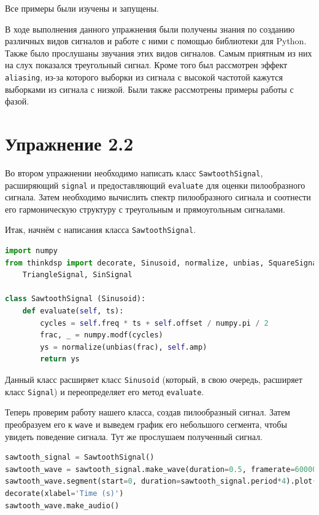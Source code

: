 \documentclass[a4paper, 14pt]{extarticle}
\begin{document}
    Все примеры были изучены и запущены.

    В ходе выполнения данного упражнения были получены знания по созданию различных видов сигналов и работе с ними с помощью библиотеки для Python.
    Также было прослушаны звучания этих видов сигналов. Самым приятным из них на слух показался треугольный сигнал.
    Кроме того был рассмотрен эффект \texttt{aliasing}, из-за которого выборки из сигнала с высокой частотой кажутся выборками из сигнала с низкой.
    Были также рассмотрены примеры работы с фазой.

    \newpage

    \section{Упражнение 2.2}
    \label{sec:task2}

    Во втором упражнении необходимо написать класс \texttt{SawtoothSignal}, расширяющий \texttt{signal} и предоставляющий \texttt{evaluate} для оценки пилообразного сигнала.
    Затем необходимо вычислить спектр пилообразного сигнала и соотнести его гармоническую структуру с треугольным и прямоугольным сигналами.

    Итак, начнём с написания класса \texttt{SawtoothSignal}.

    \begin{lstlisting}[language=Python, caption= Создание класса \texttt{SawtoothSignal}., label={lst:task2_create_class}]
import numpy
from thinkdsp import decorate, Sinusoid, normalize, unbias, SquareSignal, \
    TriangleSignal, SinSignal

class SawtoothSignal (Sinusoid):
    def evaluate(self, ts):
        cycles = self.freq * ts + self.offset / numpy.pi / 2
        frac, _ = numpy.modf(cycles)
        ys = normalize(unbias(frac), self.amp)
        return ys
    \end{lstlisting}

    Данный класс расширяет класс \texttt{Sinusoid} (который, в свою очередь, расширяет класс \texttt{Signal}) и переопределяет его метод \texttt{evaluate}.

    Теперь проверим работу нашего класса, создав пилообразный сигнал. Затем преобразуем его к \texttt{wave} и выведем график его небольшого сегмента, чтобы увидеть поведение сигнала.
    Тут же прослушаем полученный сигнал.

    \begin{lstlisting}[language=Python, caption= Работа с пилообразным сигналом., label={lst:task2_work_with_swatooth}]
sawtooth_signal = SawtoothSignal()
sawtooth_wave = sawtooth_signal.make_wave(duration=0.5, framerate=60000)
sawtooth_wave.segment(start=0, duration=sawtooth_signal.period*4).plot()
decorate(xlabel='Time (s)')
sawtooth_wave.make_audio()
    \end{lstlisting}
\end{document}
